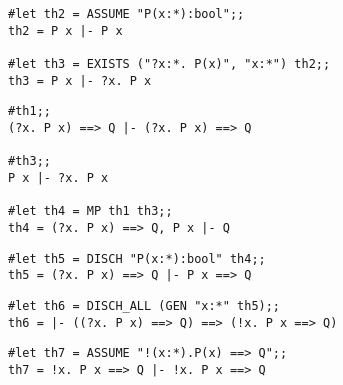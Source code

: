 \vskip 4mm
\begin{session}\begin{verbatim}
#let th2 = ASSUME "P(x:*):bool";;
th2 = P x |- P x

#let th3 = EXISTS ("?x:*. P(x)", "x:*") th2;;
th3 = P x |- ?x. P x
\end{verbatim}\end{session}




\vskip 4mm
\begin{session}\begin{verbatim}
#th1;;
(?x. P x) ==> Q |- (?x. P x) ==> Q

#th3;;
P x |- ?x. P x

#let th4 = MP th1 th3;;
th4 = (?x. P x) ==> Q, P x |- Q
\end{verbatim}\end{session}

\vskip 4mm
\begin{session}\begin{verbatim}
#let th5 = DISCH "P(x:*):bool" th4;;
th5 = (?x. P x) ==> Q |- P x ==> Q
\end{verbatim}\end{session}

\vskip 4mm
\begin{session}\begin{verbatim}
#let th6 = DISCH_ALL (GEN "x:*" th5);;
th6 = |- ((?x. P x) ==> Q) ==> (!x. P x ==> Q)
\end{verbatim}\end{session}


\vskip 4mm
\begin{session}\begin{verbatim}
#let th7 = ASSUME "!(x:*).P(x) ==> Q";;
th7 = !x. P x ==> Q |- !x. P x ==> Q
\end{verbatim}\end{session}




